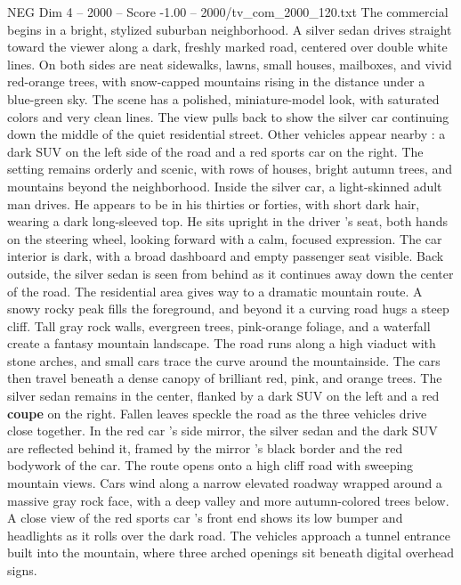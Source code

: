 \begin{textsample}{NEG Dim 4 – 2000 – Score -1.00 – 2000/tv\_com\_2000\_120.txt}  \label{ex:f4_neg_048}
The commercial begins in a bright, stylized suburban neighborhood.
A silver sedan drives straight toward the viewer along a dark, freshly marked road, centered over double white lines.
On both sides are neat sidewalks, lawns, small houses, mailboxes, and vivid red-orange trees, with snow-capped mountains rising in the distance under a blue-green sky.
The scene has a polished, miniature-model look, with saturated colors and very clean lines.
The view pulls back to show the silver car continuing down the middle of the quiet residential street.
Other vehicles appear nearby : a dark SUV on the left side of the road and a red sports car on the right.
The setting remains orderly and scenic, with rows of houses, bright autumn trees, and mountains beyond the neighborhood.
Inside the silver car, a light-skinned adult man drives.
He appears to be in his thirties or forties, with short dark hair, wearing a dark long-sleeved top.
He sits upright in the driver ’s seat, both hands on the steering wheel, looking forward with a calm, focused expression.
The car interior is dark, with a broad dashboard and empty passenger seat visible.
Back outside, the silver sedan is seen from behind as it continues away down the center of the road.
The residential area gives way to a dramatic mountain route.
A snowy rocky peak fills the foreground, and beyond it a curving road hugs a steep cliff.
Tall gray rock walls, evergreen trees, pink-orange foliage, and a waterfall create a fantasy mountain landscape.
The road runs along a high viaduct with stone arches, and small cars trace the curve around the mountainside.
The cars then travel beneath a dense canopy of brilliant red, pink, and orange trees.
The silver sedan remains in the center, flanked by a dark SUV on the left and a red \textbf{coupe} on the right.
Fallen leaves speckle the road as the three vehicles drive close together.
In the red car ’s side mirror, the silver sedan and the dark SUV are reflected behind it, framed by the mirror ’s black border and the red bodywork of the car.
The route opens onto a high cliff road with sweeping mountain views.
Cars wind along a narrow elevated roadway wrapped around a massive gray rock face, with a deep valley and more autumn-colored trees below.
A close view of the red sports car ’s front end shows its low bumper and headlights as it rolls over the dark road.
The vehicles approach a tunnel entrance built into the mountain, where three arched openings sit beneath digital overhead signs.

\end{textsample}
